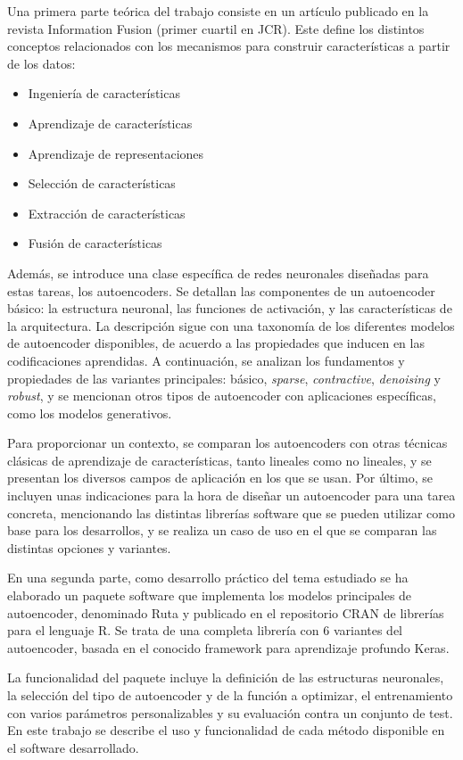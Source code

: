 \documentclass[oneside,openright,titlepage,numbers=noenddot,openany,headinclude,footinclude=true,
cleardoublepage=empty,abstractoff,BCOR=5mm,paper=a4,fontsize=12pt,main=spanish]{scrreprt}
\begin{document}
Una primera parte teórica del trabajo consiste en un artículo publicado en la revista Information Fusion (primer cuartil en JCR). Este define los distintos conceptos relacionados con los mecanismos para construir características a partir de los datos:
\begin{itemize}
\item Ingeniería de características
\item Aprendizaje de características
\item Aprendizaje de representaciones
\item Selección de características
\item Extracción de características
\item Fusión de características
\end{itemize}
Además, se introduce una clase específica de redes neuronales diseñadas para estas tareas, los autoencoders. Se detallan las componentes de un autoencoder básico: la estructura neuronal, las funciones de activación, y las características de la arquitectura. La descripción sigue con una taxonomía de los diferentes modelos de autoencoder disponibles, de acuerdo a las propiedades que inducen en las codificaciones aprendidas. A continuación, se analizan los fundamentos y propiedades de las variantes principales: básico, \textit{sparse}, \textit{contractive}, \textit{denoising} y \textit{robust}, y se mencionan otros tipos de autoencoder con aplicaciones específicas, como los modelos generativos.

Para proporcionar un contexto, se comparan los autoencoders con otras técnicas clásicas de aprendizaje de características, tanto lineales como no lineales, y se presentan los diversos campos de aplicación en los que se usan. Por último, se incluyen unas indicaciones para la hora de diseñar un autoencoder para una tarea concreta, mencionando las distintas librerías software que se pueden utilizar como base para los desarrollos, y se realiza un caso de uso en el que se comparan las distintas opciones y variantes.

En una segunda parte, como desarrollo práctico del tema estudiado se ha elaborado un paquete software que implementa los modelos principales de autoencoder, denominado Ruta y publicado en el repositorio CRAN de librerías para el lenguaje R. Se trata de una completa librería con 6 variantes del autoencoder, basada en el conocido framework para aprendizaje profundo Keras.

La funcionalidad del paquete incluye la definición de las estructuras neuronales, la selección del tipo de autoencoder y de la función a optimizar, el entrenamiento con varios parámetros personalizables y su evaluación contra un conjunto de test. En este trabajo se describe el uso y funcionalidad de cada método disponible en el software desarrollado.
\end{document}
